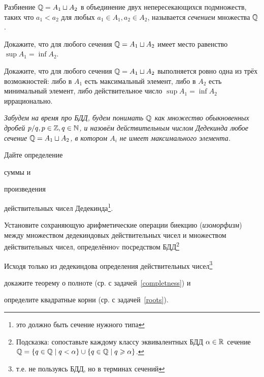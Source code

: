\documentclass[a4paper, 12pt, num=26]{listok}
\begin{document}
\begin{definition}
	Разбиение $\mathbb{Q} = A_1 \sqcup A_2$ в объединение двух непересекающихся подмножеств,
	таких что $a_1 < a_2$ для любых $a_1 \in A_1, a_2 \in A_2$, называется \textit{сечением} множества $\mathbb{Q}$.
\end{definition}
\begin{problem}
	Докажите, что для любого сечения $\mathbb{Q} = A_1 \sqcup A_2$ имеет место равенство $\sup A_1 = \inf A_2$.
\end{problem}
\begin{problem}
	Докажите, что для любого сечения $\mathbb{Q} = A_1 \sqcup A_2$ выполняется ровно одна из трёх возможностей:
	либо в $A_1$ есть максимальный элемент, либо в $A_2$ есть минимальный элемент,
	либо действительное число $\sup A_1 = \inf A_2$ иррационально.
\end{problem}

\textit{%
	Забудем на время про БДД, будем понимать $\mathbb{Q}$ как множество обыкновенных дробей
	$p/q, p \in \mathbb{Z}, q \in \mathbb{N}$, и назовём действительным числом Дедекинда любое сечение
	$\mathbb{Q} = A_1 \sqcup A_2$, в котором $A_i$ не имеет максимального элемента.
}

\begin{problem}
	Дайте определение
	\begin{probparts}
		\item суммы и
		\item произведения
	\end{probparts}
	действительных чисел Дедекинда\footnote{это должно быть сечение нужного типа}.
\end{problem}
\begin{problem}
	Установите сохраняющую арифметические операции биекцию (\textit{изоморфизм}) между множеством
	дедекиндовых действительных чисел и множеством действительных чисел, определённоv посредством БДД\footnote{%
	Подсказка: сопоставьте каждому классу эквивалентных БДД $\alpha \in \mathbb{R}$ сечение
	$\mathbb{Q} = \{ q \in \mathbb{Q} \mid q < \alpha \} \cup \{ q \in \mathbb{Q} \mid q \geqslant \alpha \}$.}
\end{problem}
\begin{problem}
	Исходя только из дедекиндова определения действительных чисел\footnote{т.е. не пользуясь БДД, но в терминах сечений}
	\begin{probparts}
		\item докажите теорему о полноте (ср. с задачей~\ref{completness}) и
		\item определите квадратные корни (ср. с задачей~\ref{roots}).
	\end{probparts}
\end{problem}
\end{document}
